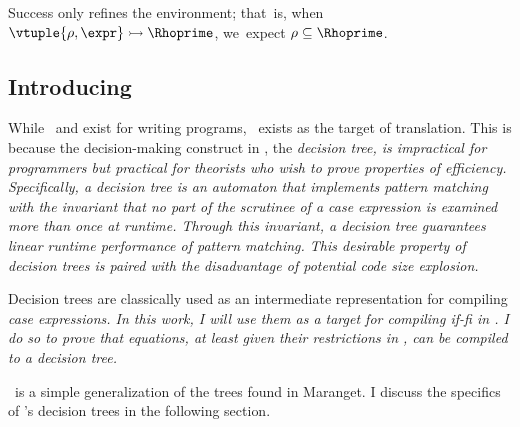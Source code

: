 \documentclass[manuscript,screen,review, 12pt, nonacm]{acmart}
\begin{document}
    \medskip
        
    Success only refines the environment; that~is, when ${\vtuple{\rho, \expr}}
    \rightarrowtail{} {\Rhoprime}$, we~expect $\rho \subseteq \Rhoprime$.
    
    \vfilbreak

\vmsemantics

\subsection{Introducing \D}
\label{d}

While \PPlus\ and \VMinus exist for writing programs, \D\ exists as the target
of translation. This is because the decision-making construct in \D, the
\it{decision tree}, is impractical for programmers but practical for theorists
who wish to prove properties of efficiency. Specifically, a decision tree is an
automaton that implements pattern matching with the invariant that no part of
the scrutinee of a \it{case} expression is examined more than once at runtime.
Through this invariant, a decision tree guarantees linear runtime performance of
pattern matching. This desirable property of decision trees is paired with the
disadvantage of potential code size explosion. 

Decision trees are classically used as an intermediate representation for
compiling \it{case} expressions. In this work, I will use them as a target for
compiling \it{if-fi} in \VMinus. I do so to prove that equations, at least given
their restrictions in \VMinus, can be compiled to a decision tree. 

\D\ is a simple generalization of the trees found in Maranget\cite{maranget}. I
discuss the specifics of \D's decision trees in the following section. 
\end{document}
